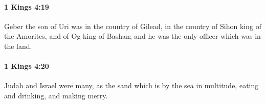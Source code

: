 		\paragraph{1 Kings 4:19} %
			\label{1KINGS-4-19}

			Geber the son of Uri was in the country of Gilead, in the country of Sihon king of the Amorites, and of Og king of Bashan; and he was the only officer which was in the land.


		\paragraph{1 Kings 4:20} %
			\label{1KINGS-4-20}

			Judah and Israel were many, as the sand which is by the sea in multitude, eating and drinking, and making merry.


